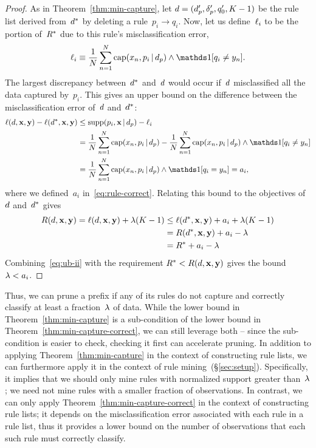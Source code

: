 \begin{arxiv}
\begin{proof}
As in Theorem~\ref{thm:min-capture},
let ${{d} =  (d_p', \delta_p', q_0', K-1)}$ be the rule list
derived from~$d^*$ by deleting a rule~${p_i \rightarrow q_i}$.
%
Now, let us define~$\ell_i$ to be the portion of~$R^*$
due to this rule's misclassification error,
\begin{align}
\Loss_i \equiv \frac{1}{N} \sum_{n=1}^N
  \Cap(x_n, p_i \given \Prefix) \wedge \one [ q_i \neq y_n ].
\end{align}
The largest discrepancy between~$d^*$ and~${d}$ would
occur if~${d}$ misclassified all the data captured by~$p_i$.
%
This gives an upper bound on the difference between
the misclassification error of~${d}$ and~$d^*$:
\begin{align}
\Loss(\RL, \x, \y) - \Loss(\OptimalRL, \x, \y)
&\le \Supp(p_i, \x \given \Prefix) - \Loss_i \nn \\
&= \frac{1}{N} \sum_{n=1}^N \Cap(x_n, p_i \given \Prefix)
  - \frac{1}{N} \sum_{n=1}^N
  \Cap(x_n, p_i \given \Prefix) \wedge \one [ q_i \neq y_n ] \nn \\
&= \frac{1}{N} \sum_{n=1}^N
  \Cap(x_n, p_i \given \Prefix) \wedge \one [ q_i = y_n ] = a_i,
\end{align}
where we defined~$a_i$ in~\eqref{eq:rule-correct}.
%
Relating this bound to the objectives of~${d}$ and~$d^*$ gives
\begin{align}
R({d}, \mathbf{x}, \mathbf{y}) = \ell({d}, \mathbf{x}, \mathbf{y}) + {\lambda} (K - 1)
&\le \ell(d^*, \mathbf{x}, \mathbf{y}) + a_i + {\lambda}(K - 1) \nonumber \\
&= R(d^*, \mathbf{x}, \mathbf{y}) + a_i - {\lambda} \nonumber \\
&= R^* + a_i - {\lambda}
\label{eq:ub-ii}
\end{align}
Combining~\eqref{eq:ub-ii} with the requirement
${R^* < R({d}, \mathbf{x}, \mathbf{y})}$ gives the bound~${{\lambda} < a_i}$.
\end{proof}
\end{arxiv}

Thus, we can prune a prefix if any of its rules do not capture
and correctly classify at least a fraction~${\lambda}$ of data.
%
While the lower bound in Theorem~\ref{thm:min-capture} is a sub-condition
of the lower bound in Theorem~\ref{thm:min-capture-correct},
we can still leverage both -- since the sub-condition is easier to check,
checking it first can accelerate pruning.
%
In addition to applying Theorem~\ref{thm:min-capture} in the context of
constructing rule lists, we can furthermore apply it in the context of
rule mining~(\S\ref{sec:setup}).
%
Specifically, it implies that we should only mine rules with
normalized support greater than~${\lambda}$;
we need not mine rules with a smaller fraction of observations.
%
In contrast, we can only apply Theorem~\ref{thm:min-capture-correct}
in the context of constructing rule lists;
it depends on the misclassification error associated with each
rule in a rule list, thus it provides a lower bound on the number of
observations that each such rule must correctly classify.


